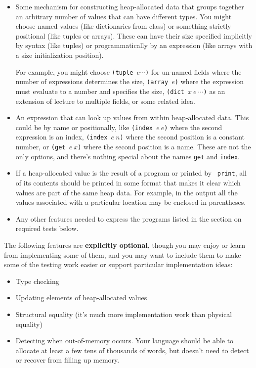 \documentclass[10pt, oneside]{article}
\begin{document}
\begin{itemize}

\item Some mechanism for constructing heap-allocated data that groups
together an arbitrary number of values that can have different types. You
might choose named values (like dictionaries from class) or something
strictly positional (like tuples or arrays). These can have their size
specified implicitly by syntax (like tuples) or programmatically by an
expression (like arrays with a size initialization position).

For example, you might choose {\tt (tuple $e \cdots$)} for un-named fields
where the number of expressions determines the size, {\tt (array $e$)} where
the expression must evaluate to a number and specifies the size, {\tt (dict
$x\ e\ \cdots$)} as an extension of lecture to multiple fields, or some
related idea.

\item An expression that can look up values from within heap-allocated data.
This could be by name or positionally, like {\tt (index $e\ e$)} where the
second expression is an index, {\tt (index $e\ n$)} where the second position
is a constant number, or {\tt (get $e\ x$)} where the second position is a
name. These are not the only options, and there's nothing special about the
names {\tt get} and {\tt index}.

\item If a heap-allocated value is the result of a program or printed by {\tt
print}, all of its contents should be printed in some format that makes it
clear which values are part of the same heap data. For example, in the output
all the values associated with a particular location may be enclosed in
parentheses.

\item Any other features needed to express the programs listed in the section
on required tests below.

\end{itemize}

The following features are {\bf explicitly optional}, though you may enjoy or
learn from implementing some of them, and you may want to include them to
make some of the testing work easier or support particular implementation
ideas:

\begin{itemize}
\item Type checking
\item Updating elements of heap-allocated values
\item Structural equality (it's much more implementation work than physical equality)
\item Detecting when out-of-memory occurs. Your language should be able to
allocate at least a few tens of thousands of words, but doesn't need to
detect or recover from filling up memory.
\end{itemize}
\end{document}
